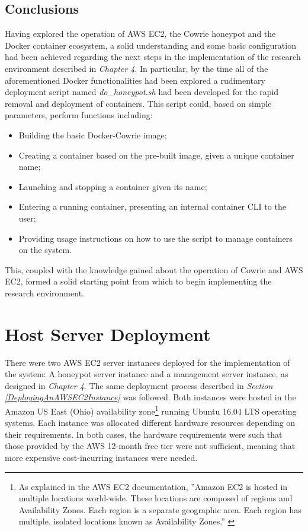 \subsection{Conclusions} \label{ConclusionsToExperimentationSection}
Having explored the operation of AWS EC2, the Cowrie honeypot and the Docker container ecosystem, a solid understanding and some basic configuration had been achieved regarding the next steps in the implementation of the research environment described in \textit{Chapter 4}.  In particular, by the time all of the aforementioned Docker functionalities had been explored a rudimentary deployment script named \textit{do\_honeypot.sh} had been developed for the rapid removal and deployment of containers. This script could, based on simple parameters, perform functions including:

\begin{itemize}
\item Building the basic Docker-Cowrie image;
\item Creating a container based on the pre-built image, given a unique container name;
\item Launching and stopping a container given its name;
\item Entering a running container, presenting an internal container CLI to the user;
\item Providing usage instructions on how to use the script to manage containers on the system.
\end{itemize}

This, coupled with the knowledge gained about the operation of Cowrie and AWS EC2, formed a solid starting point from which to begin implementing the research environment.





\section{Host Server Deployment} \label{HostServerSetup}

There were two AWS EC2 server instances deployed for the implementation of the system: A honeypot server instance and a management server instance, as designed in \textit{Chapter 4}. The same deployment process described in \textit{Section \ref{DeployingAnAWSEC2Instance}} was followed. Both instances were hosted in the Amazon US East (Ohio) availability zone\footnote{As explained in the AWS EC2 documentation, ''Amazon EC2 is hosted in multiple locations world-wide. These locations are composed of regions and Availability Zones. Each region is a separate geographic area. Each region has multiple, isolated locations known as Availability Zones.'' \cite{WhatAreAWSAvailabilityZones}} running Ubuntu 16.04 LTS operating systems. Each instance was allocated different hardware resources depending on their requirements. In both cases, the hardware requirements were such that those provided by the AWS 12-month free tier were not sufficient, meaning that more expensive cost-incurring instances were needed.

